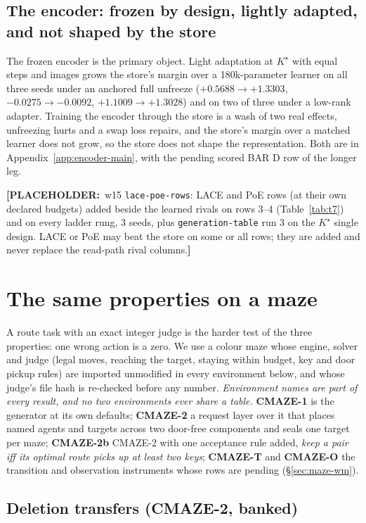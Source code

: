 \documentclass{article}
\newcommand{\PLACEHOLDER}[1]{{\color{red}\textbf{[PLACEHOLDER:}~#1\textbf{]}}}
\newcommand{\Kstar}{\ensuremath{K^{\star}}}
\begin{document}
\subsection{The encoder: frozen by design, lightly adapted, and not shaped by the store}
\label{sec:adapt}\label{sec:bard}
The frozen encoder is the primary object. Light adaptation at $\Kstar$ with equal steps and
images grows the store's margin over a 180k-parameter learner on all three seeds under an
anchored full unfreeze ($+0.5688\to+1.3303$, $-0.0275\to-0.0092$, $+1.1009\to+1.3028$) and on two
of three under a low-rank adapter.
Training the encoder through the store is a wash of two real effects, unfreezing hurts and a swap
loss repairs, and the store's margin over a matched learner does not grow, so the store does not
shape the representation. Both are in Appendix~\ref{app:encoder-main}, with the pending scored BAR
D row of the longer leg.

\PLACEHOLDER{w15 \texttt{lace-poe-rows}: LACE and PoE rows (at their own declared budgets) added
beside the learned rivals on rows 3--4 (Table~\ref{tab:t7}) and on every ladder rung, 3 seeds,
plus \texttt{generation-table} run 3 on the $\Kstar$ single design. LACE or PoE may beat the store
on some or all rows; they are added and never replace the read-path rival columns.}

\section{The same properties on a maze}
\label{sec:maze}

A route task with an exact integer judge is the harder test of the three properties: one
wrong action is a zero. We use a colour maze whose engine, solver and judge (legal moves,
reaching the target, staying within budget, key and door pickup rules) are imported unmodified
in every environment below, and whose judge's file hash is re-checked before any number.
\emph{Environment names are part of every result, and no two environments ever share a
table.}
\textbf{CMAZE-1} is the generator at its own defaults; \textbf{CMAZE-2} a request layer over it
that places named agents and targets across two door-free components and seals one target per
maze; \textbf{CMAZE-2b} CMAZE-2 with one acceptance rule added, \emph{keep a pair iff its optimal
route picks up at least two keys}; \textbf{CMAZE-T} and \textbf{CMAZE-O} the transition and
observation instruments whose rows are pending (\S\ref{sec:maze-wm}).

\subsection{Deletion transfers (CMAZE-2, banked)}
\label{sec:maze-del}
\end{document}
